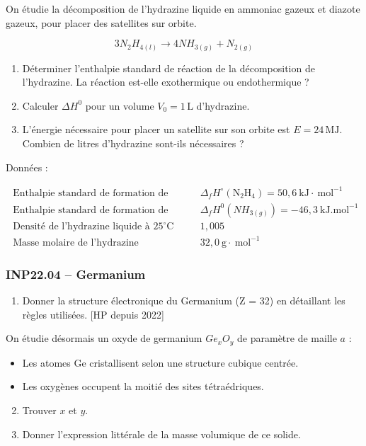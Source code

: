 On étudie la décomposition de l'hydrazine liquide en ammoniac gazeux et diazote gazeux, pour placer des satellites sur orbite.

\[
3 N_2H_{4(l)} \rightarrow 4 NH_{3(g)} + N_{2(g)}
\]

\begin{enumerate}
    \item Déterminer l'enthalpie standard de réaction de la décomposition de l'hydrazine. La réaction est-elle exothermique ou endothermique ?
    \item Calculer $\Delta H^0$ pour un volume $V_0 = 1\, \text{L}$ d'hydrazine.
    \item L'énergie nécessaire pour placer un satellite sur son orbite est $E = 24\, \text{MJ}$. Combien de litres d'hydrazine sont-ils nécessaires ?
\end{enumerate}

Données :

$
\begin{array}{ll}
\text { Enthalpie standard de formation de l'hydrazine } & \Delta_f H^{\circ}\left(\mathrm{N}_2 \mathrm{H}_4\right)=50,6 \mathrm{~kJ} \cdot \mathrm{~mol}^{-1} \\
\text { Enthalpie standard de formation de l'ammoniac } & \Delta_f H^0\left(N H_{3(g)}\right)=-46,3 \mathrm{~kJ} . \mathrm{mol}^{-1} \\
\text { Densité de l'hydrazine liquide à } 25^{\circ} \mathrm{C} & 1,005 \\
\text { Masse molaire de l'hydrazine } & 32,0 \mathrm{~g} \cdot \mathrm{~mol}^{-1}
\end{array}
$

\subsubsection*{INP22.04 -- Germanium  \corrige}

\begin{enumerate}
    \item Donner la structure électronique du Germanium (Z = 32) en détaillant les règles utilisées. [HP depuis 2022]
\end{enumerate}

On étudie désormais un oxyde de germanium $Ge_xO_y$ de paramètre de maille $a$ :
\begin{itemize}
    \item Les atomes Ge cristallisent selon une structure cubique centrée.
    \item Les oxygènes occupent la moitié des sites tétraédriques.
\end{itemize}
\begin{enumerate}
    \setcounter{enumi}{1}
    \item Trouver $x$ et $y$.
    \item Donner l'expression littérale de la masse volumique de ce solide.
\end{enumerate}


